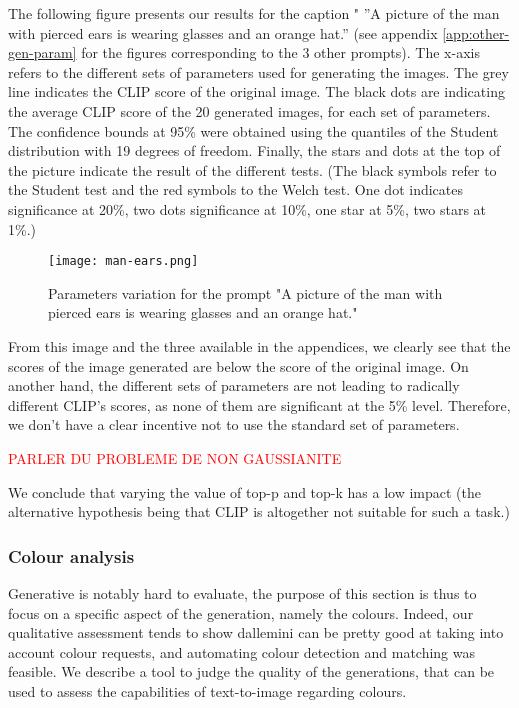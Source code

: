\documentclass{article}
\begin{document}
\begin{multicols}{2}
The following figure presents our results for the caption " ”A
picture of the man with pierced ears is wearing
glasses and an orange hat.” (see appendix  \ref{app:other-gen-param} for the figures corresponding to the 3 other prompts). The x-axis refers to the different sets of parameters used for generating the images. The grey line indicates the CLIP score of the original image. The black dots are indicating the average CLIP score of the 20 generated images, for each set of parameters. The confidence bounds at 95\% were obtained using the quantiles of the Student distribution with 19 degrees of freedom. 
Finally, the stars and dots at the top of the picture indicate the result of the different tests. (The black symbols refer to the Student test and the red symbols to the Welch test. One dot indicates significance at 20\%, two dots significance at 10\%, one star at 5\%, two stars at 1\%.)

\begin{figure}[H]
    \centering
    \texttt{[image: man-ears.png]} %
    \caption{Parameters variation for the prompt "A picture of the man with pierced ears is wearing glasses and an orange hat."}
    \label{fig:gen-man-ears}
\end{figure}

From this image and the three available in the appendices, we clearly see that the scores of the image generated are below the score of the original image. On another hand, the different sets of parameters are not leading to radically different CLIP's scores, as none of them are significant at the 5\% level. Therefore, we don't have a clear incentive not to use the standard set of parameters.  

\textcolor{red}{PARLER DU PROBLEME DE NON GAUSSIANITE}

We conclude that varying the value of top-p and top-k has a low impact (the alternative hypothesis being that CLIP is altogether not suitable for such a task.)

\subsubsection{Colour analysis}

Generative is notably hard to evaluate, the purpose of this section is thus to focus on a specific aspect of the generation, namely the colours.
Indeed, our qualitative assessment tends to show \gls{dallemini} can be pretty good at taking into account colour requests, and automating colour detection and matching was feasible.
We describe a tool to judge the quality of the generations, that can be used to assess the capabilities of text-to-image regarding colours.


\end{multicols}
\end{document}
